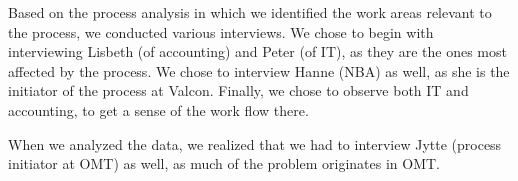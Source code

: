 Based on the process analysis in which we identified the work areas relevant to the process, we conducted various interviews.
We chose to begin with interviewing Lisbeth (of accounting) and Peter (of IT), as they are the ones most affected by the process.
We chose to interview Hanne (NBA) as well, as she is the initiator of the process at Valcon.
Finally, we chose to observe both IT and accounting, to get a sense of the work flow there.

When we analyzed the data, we realized that we had to interview Jytte (process initiator at OMT) as well, as much of the problem originates in OMT.

